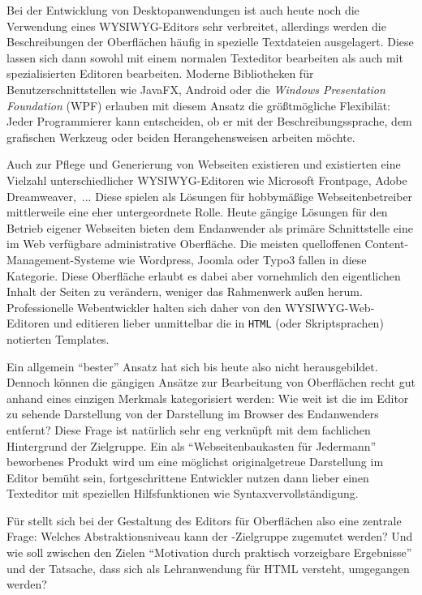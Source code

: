 Bei der Entwicklung von Desktopanwendungen ist auch heute noch die Verwendung eines WYSIWYG-Editors sehr verbreitet, allerdings werden die Beschreibungen der Oberflächen häufig in spezielle Textdateien ausgelagert. Diese lassen sich dann sowohl mit einem normalen Texteditor bearbeiten als auch mit spezialisierten Editoren bearbeiten. Moderne Bibliotheken für Benutzerschnittstellen wie JavaFX, Android oder die \textit{Windows Presentation Foundation} (WPF) erlauben mit diesem Ansatz die größtmögliche Flexibilät: Jeder Programmierer kann entscheiden, ob er mit der Beschreibungssprache, dem grafischen Werkzeug oder beiden Herangehensweisen arbeiten möchte.

Auch zur Pflege und Generierung von Webseiten existieren und existierten eine Vielzahl unterschiedlicher WYSIWYG-Editoren wie Microsoft Frontpage, Adobe Dreamweaver,~... Diese spielen als Lösungen für hobbymäßige Webseitenbetreiber mittlerweile eine eher untergeordnete Rolle. Heute gängige Lösungen für den Betrieb eigener Webseiten bieten dem Endanwender als primäre Schnittstelle eine im Web verfügbare administrative Oberfläche. Die meisten quelloffenen Content-Management-Systeme wie Wordpress, Joomla oder Typo3 fallen in diese Kategorie. Diese Oberfläche erlaubt es dabei aber vornehmlich den eigentlichen Inhalt der Seiten zu verändern, weniger das Rahmenwerk außen herum. Professionelle Webentwickler halten sich daher von den WYSIWYG-Web-Editoren und editieren lieber unmittelbar die in \texttt{HTML} (oder Skriptsprachen) notierten Templates.

Ein allgemein "`bester"' Ansatz hat sich bis heute also nicht herausgebildet. Dennoch können die gängigen Ansätze zur Bearbeitung von Oberflächen recht gut anhand eines einzigen Merkmals kategorisiert werden: Wie weit ist die im Editor zu sehende Darstellung von der Darstellung im Browser des Endanwenders entfernt? Diese Frage ist natürlich sehr eng verknüpft mit dem fachlichen Hintergrund der Zielgruppe. Ein als "`Webseitenbaukasten für Jedermann"' beworbenes Produkt wird um eine möglichst originalgetreue Darstellung im Editor bemüht sein, fortgeschrittene Entwickler nutzen dann lieber einen Texteditor mit speziellen Hilfsfunktionen wie Syntaxvervollständigung.

Für \idename{} stellt sich bei der Gestaltung des Editors für Oberflächen also eine zentrale Frage: Welches Abstraktionsniveau kann der \idename{}-Zielgruppe zugemutet werden? Und wie soll zwischen den Zielen "`Motivation durch praktisch vorzeigbare Ergebnisse"' und der Tatsache, dass \idename{} sich als Lehranwendung für HTML versteht, umgegangen werden?

